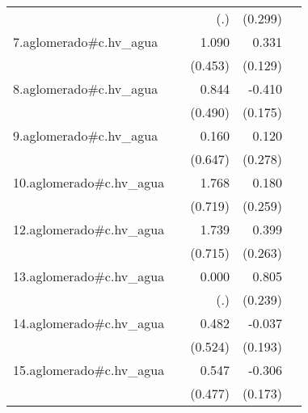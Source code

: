 {\begin{longtable}{l*{4}{D{.}{.}{-1}}}
            &                     &         (.)         &     (0.299)         &                     \\
\addlinespace
7.aglomerado#c.hv\_agua&                     &       1.090\sym{*}  &       0.331\sym{*}  &                     \\
            &                     &     (0.453)         &     (0.129)         &                     \\
\addlinespace
8.aglomerado#c.hv\_agua&                     &       0.844         &      -0.410\sym{*}  &                     \\
            &                     &     (0.490)         &     (0.175)         &                     \\
\addlinespace
9.aglomerado#c.hv\_agua&                     &       0.160         &       0.120         &                     \\
            &                     &     (0.647)         &     (0.278)         &                     \\
\addlinespace
10.aglomerado#c.hv\_agua&                     &       1.768\sym{*}  &       0.180         &                     \\
            &                     &     (0.719)         &     (0.259)         &                     \\
\addlinespace
12.aglomerado#c.hv\_agua&                     &       1.739\sym{*}  &       0.399         &                     \\
            &                     &     (0.715)         &     (0.263)         &                     \\
\addlinespace
13.aglomerado#c.hv\_agua&                     &       0.000         &       0.805\sym{***}&                     \\
            &                     &         (.)         &     (0.239)         &                     \\
\addlinespace
14.aglomerado#c.hv\_agua&                     &       0.482         &      -0.037         &                     \\
            &                     &     (0.524)         &     (0.193)         &                     \\
\addlinespace
15.aglomerado#c.hv\_agua&                     &       0.547         &      -0.306         &                     \\
            &                     &     (0.477)         &     (0.173)         &                     \\

\end{longtable}}
